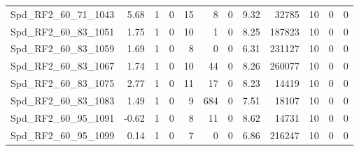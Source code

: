 \begin{longtable}[c]{@{}lrrrrrrrrrrr@{}}
Spd\_RF2\_60\_71\_1043       & 5.68                   & 1                       & 0                       & 15                     & 8                       & 0                       & 9.32                    & 32785                    & 10                       & 0                        & 0                        \\
Spd\_RF2\_60\_83\_1051       & 1.75                   & 1                       & 0                       & 10                     & 1                       & 0                       & 8.25                    & 187823                   & 10                       & 0                        & 0                        \\
Spd\_RF2\_60\_83\_1059       & 1.69                   & 1                       & 0                       & 8                      & 0                       & 0                       & 6.31                    & 231127                   & 10                       & 0                        & 0                        \\
Spd\_RF2\_60\_83\_1067       & 1.74                   & 1                       & 0                       & 10                     & 44                      & 0                       & 8.26                    & 260077                   & 10                       & 0                        & 0                        \\
Spd\_RF2\_60\_83\_1075       & 2.77                   & 1                       & 0                       & 11                     & 17                      & 0                       & 8.23                    & 14419                    & 10                       & 0                        & 0                        \\
Spd\_RF2\_60\_83\_1083       & 1.49                   & 1                       & 0                       & 9                      & 684                     & 0                       & 7.51                    & 18107                    & 10                       & 0                        & 0                        \\
Spd\_RF2\_60\_95\_1091       & -0.62                  & 1                       & 0                       & 8                      & 11                      & 0                       & 8.62                    & 14731                    & 10                       & 0                        & 0                        \\
Spd\_RF2\_60\_95\_1099       & 0.14                   & 1                       & 0                       & 7                      & 0                       & 0                       & 6.86                    & 216247                   & 10                       & 0                        & 0                        \\

\end{longtable}
